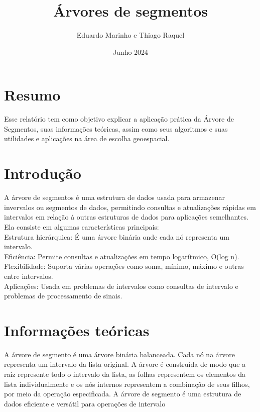 \documentclass{article}
\title{Árvores de segmentos}
\author{Eduardo Marinho e Thiago Raquel}
\date{Junho 2024}
\begin{document}
\maketitle

\section{Resumo} 
\leavevmode
\indent Esse relatório tem como objetivo explicar a aplicação prática da Árvore de Segmentos, suas informações teóricas, assim como seus algoritmos e suas utilidades e aplicações na área de escolha geoespacial.

\section{Introdução}
\leavevmode
\indent A árvore de segmentos é uma estrutura de dados usada para armazenar invervalos ou segmentos de dados, permitindo consultas e atualizações rápidas em intervalos em relação à outras estruturas de dados para aplicações semelhantes. Ela consiste em algumas características principais: \\
\leavevmode
\indent Estrutura hierárquica: É uma árvore binária onde cada nó representa um intervalo.\\
\leavevmode
\indent Eficiência: Permite consultas e atualizações em tempo logarítmico, O(log n). \\
\leavevmode
\indent Flexibilidade: Suporta várias operações como soma, mínimo, máximo e outras entre intervalos. \\
\leavevmode
\indent Aplicações: Usada em problemas de intervalos como consultas de intervalo e problemas de processamento de sinais. 


\section{Informações teóricas}
A árvore de segmento é uma árvore binária balanceada. Cada nó na árvore representa um intervalo da lista original.
A árvore é construída de modo que a raiz represente todo o intervalo da lista, as folhas representem os elementos
da lista individualmente e os nós internos representem a combinação de seus filhos, por meio da operação especificada.
A árvore de segmento é uma estrutura de dados eficiente e versátil para operações de intervalo
\end{document}
